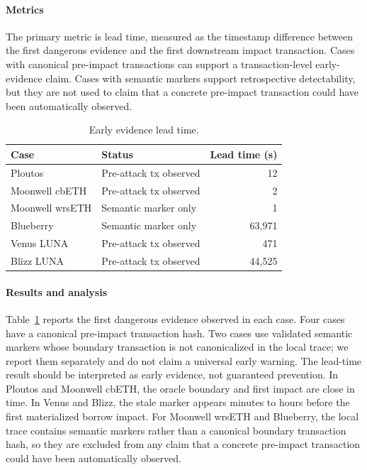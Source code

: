 \documentclass[final,5p]{elsarticle}
\begin{document}
\paragraph{Metrics}
The primary metric is lead time, measured as the timestamp difference between the first dangerous evidence and the first downstream impact transaction.
Cases with canonical pre-impact transactions can support a transaction-level early-evidence claim.
Cases with semantic markers support retrospective detectability, but they are not used to claim that a concrete pre-impact transaction could have been automatically observed.

\begin{table}[t]
\centering
\caption{Early evidence lead time.}
\label{tab:lead}
\small
\begin{tabular}{llr}
\toprule
Case & Status & Lead time (s) \\
\midrule
Ploutos & Pre-attack tx observed & 12 \\
Moonwell cbETH & Pre-attack tx observed & 2 \\
Moonwell wrsETH & Semantic marker only & 1 \\
Blueberry & Semantic marker only & 63,971 \\
Venus LUNA & Pre-attack tx observed & 471 \\
Blizz LUNA & Pre-attack tx observed & 44,525 \\
\bottomrule
\end{tabular}
\end{table}

\paragraph{Results and analysis}
Table~\ref{tab:lead} reports the first dangerous evidence observed in each case.
Four cases have a canonical pre-impact transaction hash.
Two cases use validated semantic markers whose boundary transaction is not canonicalized in the local trace; we report them separately and do not claim a universal early warning.
The lead-time result should be interpreted as early evidence, not guaranteed prevention.
In Ploutos and Moonwell cbETH, the oracle boundary and first impact are close in time.
In Venus and Blizz, the stale marker appears minutes to hours before the first materialized borrow impact.
For Moonwell wrsETH and Blueberry, the local trace contains semantic markers rather than a canonical boundary transaction hash, so they are excluded from any claim that a concrete pre-impact transaction could have been automatically observed.
\end{document}
